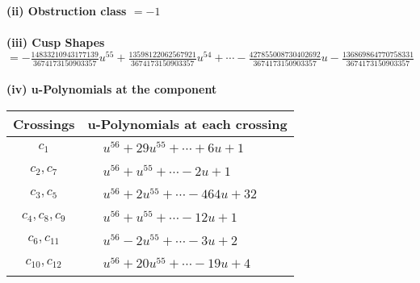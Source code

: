 \documentclass[1p]{elsarticle_modified}
\theoremstyle{definition}
\begin{document}
\flushleft \textbf{(ii) Obstruction class $= -1$}\\~\\
\flushleft \textbf{(iii) Cusp Shapes $= -\frac{14833210943177139}{3674173150903357} u^{55}+\frac{13598122062567921}{3674173150903357} u^{54}+\cdots-\frac{427855008730402692}{3674173150903357} u-\frac{136869864770758331}{3674173150903357}$}\\~\\
\newpage\renewcommand{\arraystretch}{1}
\flushleft \textbf{(iv) u-Polynomials at the component}\newline \\
\begin{tabular}{m{50pt}|m{274pt}}
Crossings & \hspace{64pt}u-Polynomials at each crossing \\
\hline $$\begin{aligned}c_{1}\end{aligned}$$&$\begin{aligned}
&u^{56}+29 u^{55}+\cdots+6 u+1
\end{aligned}$\\
\hline $$\begin{aligned}c_{2},c_{7}\end{aligned}$$&$\begin{aligned}
&u^{56}+u^{55}+\cdots-2 u+1
\end{aligned}$\\
\hline $$\begin{aligned}c_{3},c_{5}\end{aligned}$$&$\begin{aligned}
&u^{56}+2 u^{55}+\cdots-464 u+32
\end{aligned}$\\
\hline $$\begin{aligned}c_{4},c_{8},c_{9}\end{aligned}$$&$\begin{aligned}
&u^{56}+u^{55}+\cdots-12 u+1
\end{aligned}$\\
\hline $$\begin{aligned}c_{6},c_{11}\end{aligned}$$&$\begin{aligned}
&u^{56}-2 u^{55}+\cdots-3 u+2
\end{aligned}$\\
\hline $$\begin{aligned}c_{10},c_{12}\end{aligned}$$&$\begin{aligned}
&u^{56}+20 u^{55}+\cdots-19 u+4
\end{aligned}$\\
\hline
\end{tabular}\\~\\
\end{document}
